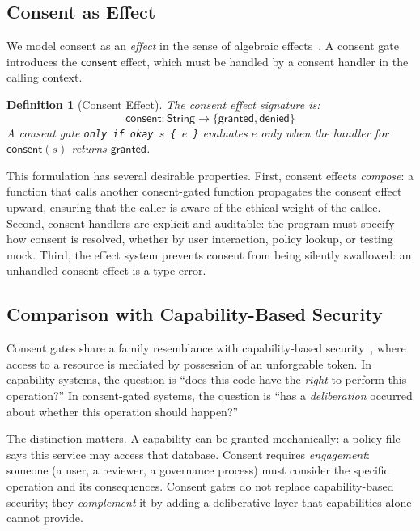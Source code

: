\documentclass[11pt,a4paper]{article}
\newtheorem{definition}[theorem]{Definition}
\newcommand{\consent}{\mathsf{consent}}
\newcommand{\granted}{\mathsf{granted}}
\newcommand{\denied}{\mathsf{denied}}
\begin{document}
\subsection{Consent as Effect}

We model consent as an \emph{effect} in the sense of algebraic
effects~\citep{plotkin2009handlers,bauer2015programming}.  A consent
gate introduces the $\consent$ effect, which must be handled by a
consent handler in the calling context.

\begin{definition}[Consent Effect]
\label{def:consent-effect}
The consent effect signature is:
\[
  \consent : \mathsf{String} \to \{\granted, \denied\}
\]
A consent gate \texttt{only if okay $s$ \{ $e$ \}} evaluates $e$
only when the handler for $\consent(s)$ returns $\granted$.
\end{definition}

This formulation has several desirable properties.  First, consent
effects \emph{compose}: a function that calls another consent-gated
function propagates the consent effect upward, ensuring that the
caller is aware of the ethical weight of the callee.  Second, consent
handlers are explicit and auditable: the program must specify how
consent is resolved, whether by user interaction, policy lookup, or
testing mock.  Third, the effect system prevents consent from being
silently swallowed: an unhandled consent effect is a type error.

\subsection{Comparison with Capability-Based Security}

Consent gates share a family resemblance with capability-based
security~\citep{dennis1966programming,miller2006robust}, where access
to a resource is mediated by possession of an unforgeable token.  In
capability systems, the question is ``does this code have the
\emph{right} to perform this operation?''  In consent-gated systems,
the question is ``has a \emph{deliberation} occurred about whether
this operation should happen?''

The distinction matters.  A capability can be granted mechanically: a
policy file says this service may access that database.  Consent
requires \emph{engagement}: someone (a user, a reviewer, a governance
process) must consider the specific operation and its consequences.
Consent gates do not replace capability-based security; they
\emph{complement} it by adding a deliberative layer that capabilities
alone cannot provide.
\end{document}
